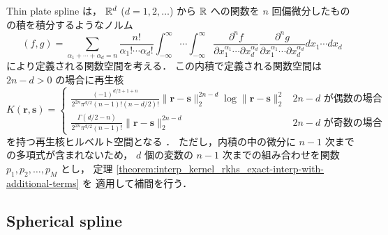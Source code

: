Thin plate spline \cite{Ghosh2010} は，
$\mathbb{R}^d$ ($d = 1, 2, \ldots$) から $\mathbb{R}$ への関数を
$n$ 回偏微分したものの積を積分するようなノルム
\begin{equation}
    (f, g) =
    \sum_{\alpha_1 + \cdots + \alpha_d = n} \frac{n!}{\alpha_1! \cdots \alpha_d!}
    \int_{-\infty}^{\infty} \cdots \int_{-\infty}^{\infty}
    \frac{\partial^n f}{\partial x_1^{\alpha_1} \cdots \partial x_d^{\alpha_d}}
    \frac{\partial^n g}{\partial x_1^{\alpha_1} \cdots \partial x_d^{\alpha_d}}
    dx_1 \cdots dx_d
    \label{eq:interp_kernel_thin-plate-spline_inner-product}
\end{equation}
により定義される関数空間を考える．
この内積で定義される関数空間は
$2n -d > 0$ の場合に再生核
\begin{equation}
    K(\bm{r}, \bm{s}) =
    \begin{cases}
        \displaystyle
        \frac{(-1)^{d/2 + 1 + n}}{2^{2n} \pi^{d/2} (n-1)! (n-d/2)!}
        \|\bm{r} - \bm{s}\|_2^{2n-d} \log{\|\bm{r} - \bm{s}\|_2^2}
         &
        \text{$2n-d$ が偶数の場合}
        \\[1.5em]
        \displaystyle
        \frac{\Gamma(d/2 - n)}{2^{2n} \pi^{d/2} (n-1)!}
        \|\bm{r} - \bm{s}\|_2^{2n-d}
         &
        \text{$2n-d$ が奇数の場合}
    \end{cases}
\end{equation}
を持つ再生核ヒルベルト空間となる
\cite{Ghosh2010}．
ただし，内積の中の微分に $n - 1$ 次までの多項式が含まれないため，
$d$ 個の変数の $n - 1$ 次までの組み合わせを関数 $p_1, p_2, \ldots, p_M$ とし，
定理 \ref{theorem:interp_kernel_rkhs_exact-interp-with-additional-terms} を
適用して補間を行う．

\subsection{Spherical spline}

